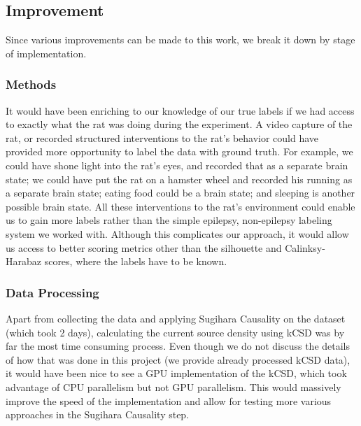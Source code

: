 \documentclass[journal,12pt,onecolumn,draftclsnofoot]{IEEEtran}  %
\begin{document}

\subsection{Improvement}
Since various improvements can be made to this work, we break it down by stage of implementation.
\subsubsection{Methods}
It would have been enriching to our knowledge of our true labels if we had access to exactly what the rat was doing during the experiment. A video capture of the rat, or recorded structured interventions to the rat's behavior could have provided more opportunity to label the data with ground truth. For example, we could have shone light into the rat's eyes, and recorded that as a separate brain state; we could have put the rat on a hamster wheel and recorded his running as a separate brain state; eating food could be a brain state; and sleeping is another possible brain state. All these interventions to the rat's environment could enable us to gain more labels rather than the simple epilepsy, non-epilepsy labeling system we worked with. Although this complicates our approach, it would allow us access to better scoring metrics other than the silhouette and Calinksy-Harabaz scores, where the labels have to be known.

\subsubsection{Data Processing}
Apart from collecting the data and applying Sugihara Causality on the dataset (which took 2 days), calculating the current source density using kCSD was by far the most time consuming process. Even though we do not discuss the details of how that was done in this project (we provide already processed kCSD data), it would have been nice to see a GPU implementation of the kCSD, which took advantage of CPU parallelism but not GPU parallelism. This would massively improve the speed of the implementation and allow for testing more various approaches in the Sugihara Causality step. 
\end{document}
